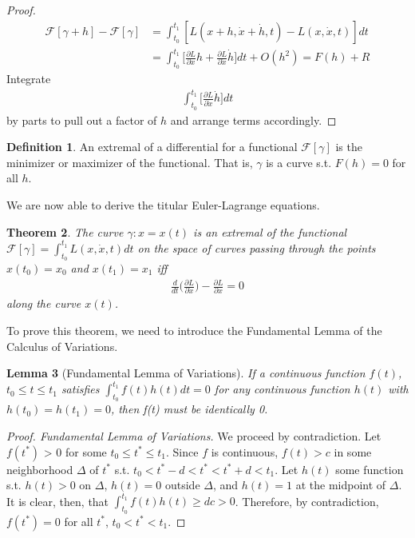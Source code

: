 \documentclass[10pt, psamsfonts]{amsart}
\newtheorem{thm}{Theorem}[section]
\newtheorem{lem}[thm]{Lemma}
\theoremstyle{definition}
\newtheorem{defn}[thm]{Definition}
\theoremstyle{remark}
\numberwithin{equation}{section}
\begin{document}
\begin{proof}
\begin{align*}
      \mathcal{F}[\gamma + h] - \mathcal{F}[\gamma] & = \int_{t_0}^{t_1} [L(x+h, \dot{x} + \dot{h}, t) - L(x, \dot{x}, t)] dt\\
      & = \int_{t_0}^{t_1} \bigg[ \frac{\partial L}{\partial x} h + \frac{\partial L}{\partial \dot{x}} \dot{h} \bigg] dt + O(h^2) = F(h) + R
\end{align*}
  Integrate
  \begin{align*}
    \int_{t_0}^{t_1} \bigg[\frac{\partial L}{\partial \dot{x}} \dot{h}\bigg] dt
  \end{align*}
   by parts to pull out a factor of $h$ and arrange terms accordingly.
\end{proof}

\begin{defn}
An extremal of a differential for a functional $\mathcal{F}[\gamma]$ is the minimizer or maximizer of the functional. That is, $\gamma$ is a curve s.t. $F(h) = 0$ for all $h$.
\end{defn}

We are now able to derive the titular Euler-Lagrange equations.
\begin{thm}
  The curve $\gamma: x = x(t)$ is an extremal of the functional $\mathcal{F}[\gamma] = \int_{t_0}^{t_1} L(x,\dot{x},t)dt $ on the space of curves passing through the points $x(t_0) = x_0$ and $x(t_1) = x_1$ iff
  \begin{align*}
    \frac{d}{dt} \bigg(\frac{\partial L}{\partial \dot{x}} \bigg) - \frac{\partial L}{\partial x} = 0 
  \end{align*}
  along the curve $x(t)$.
\end{thm}

\noindent To prove this theorem, we need to introduce the Fundamental Lemma of the Calculus of Variations.

\begin{lem}[Fundamental Lemma of Variations]
  If a continuous function $f(t)$, $t_0\leq t \leq t_1$ satisfies $\int_{t_0}^{t_1} f(t) h(t) dt = 0$ for any continuous function $h(t)$ with $h(t_0) = h(t_1) = 0$, then f(t) must be identically 0.
\end{lem}

\begin{proof}[Proof. Fundamental Lemma of Variations]
We proceed by contradiction. Let $f(t^*)$ > 0 for some $t_0 \leq t^* \leq t_1$. Since $f$ is continuous, $f(t) > c$ in some neighborhood $\Delta$ of $t^*$ s.t. $t_0 < t^* - d < t^* < t^* + d < t_1$. Let $h(t)$ some function s.t. $h(t) > 0$ on $\Delta$, $h(t)=0$ outside $\Delta$, and $h(t) = 1$ at the midpoint of $\Delta$. It is clear, then, that $\int_{t_0}^{t_1}f(t)h(t) \geq dc > 0$. Therefore, by contradiction, $f(t^*) = 0$ for all $t^*$, $t_0 < t^* < t_1$. 
\end{proof}
\end{document}
